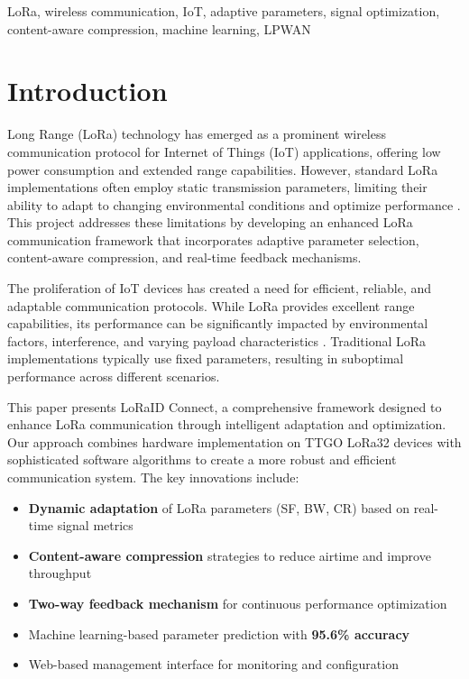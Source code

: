 \documentclass[conference]{IEEEtran}
\begin{document}
\begin{IEEEkeywords}
LoRa, wireless communication, IoT, adaptive parameters, signal optimization, content-aware compression, machine learning, LPWAN
\end{IEEEkeywords}

\section{Introduction}
Long Range (LoRa) technology has emerged as a prominent wireless communication protocol for Internet of Things (IoT) applications, offering low power consumption and extended range capabilities. However, standard LoRa implementations often employ static transmission parameters, limiting their ability to adapt to changing environmental conditions and optimize performance \cite{LoRa_review}. This project addresses these limitations by developing an enhanced LoRa communication framework that incorporates adaptive parameter selection, content-aware compression, and real-time feedback mechanisms.

The proliferation of IoT devices has created a need for efficient, reliable, and adaptable communication protocols. While LoRa provides excellent range capabilities, its performance can be significantly impacted by environmental factors, interference, and varying payload characteristics \cite{LoRa_performance}. Traditional LoRa implementations typically use fixed parameters, resulting in suboptimal performance across different scenarios.

This paper presents LoRaID Connect, a comprehensive framework designed to enhance LoRa communication through intelligent adaptation and optimization. Our approach combines hardware implementation on TTGO LoRa32 devices with sophisticated software algorithms to create a more robust and efficient communication system. The key innovations include:

\begin{itemize}
    \item \textbf{Dynamic adaptation} of LoRa parameters (SF, BW, CR) based on real-time signal metrics
    \item \textbf{Content-aware compression} strategies to reduce airtime and improve throughput
    \item \textbf{Two-way feedback mechanism} for continuous performance optimization
    \item Machine learning-based parameter prediction with \textbf{95.6\% accuracy}
    \item Web-based management interface for monitoring and configuration
\end{itemize}
\end{document}
